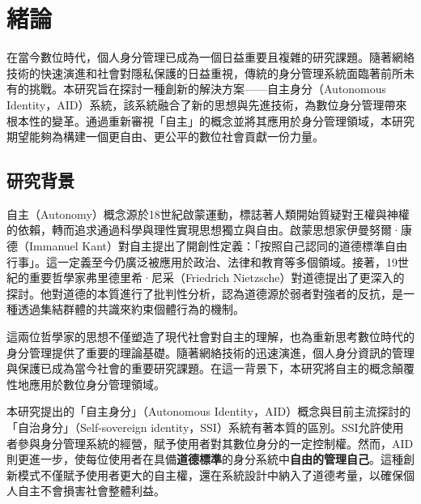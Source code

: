 
\chapter{緒論}
在當今數位時代，個人身分管理已成為一個日益重要且複雜的研究課題。隨著網絡技術的快速演進和社會對隱私保護的日益重視，傳統的身分管理系統面臨著前所未有的挑戰。本研究旨在探討一種創新的解決方案——自主身分（Autonomous Identity，AID）系統，該系統融合了新的思想與先進技術，為數位身分管理帶來根本性的變革。通過重新審視「自主」的概念並將其應用於身分管理領域，本研究期望能夠為構建一個更自由、更公平的數位社會貢獻一份力量。
\section{研究背景}
自主（Autonomy）概念源於18世紀啟蒙運動，標誌著人類開始質疑對王權與神權的依賴，轉而追求通過科學與理性實現思想獨立與自由。啟蒙思想家伊曼努爾·康德（Immanuel Kant）對自主提出了開創性定義：「按照自己認同的道德標準自由行事」。這一定義至今仍廣泛被應用於政治、法律和教育等多個領域。接著，19世紀的重要哲學家弗里德里希·尼采（Friedrich Nietzsche）對道德提出了更深入的探討。他對道德的本質進行了批判性分析，認為道德源於弱者對強者的反抗，是一種透過集結群體的共識來約束個體行為的機制。

這兩位哲學家的思想不僅塑造了現代社會對自主的理解，也為重新思考數位時代的身分管理提供了重要的理論基礎。隨著網絡技術的迅速演進，個人身分資訊的管理與保護已成為當今社會的重要研究課題。在這一背景下，本研究將自主的概念顛覆性地應用於數位身分管理領域。

本研究提出的「自主身分」（Autonomous Identity，AID）概念與目前主流探討的「自治身分」（Self-sovereign identity，SSI）系統有著本質的區別。SSI允許使用者參與身分管理系統的經營，賦予使用者對其數位身分的一定控制權。然而，AID則更進一步，使每位使用者在具備\textbf{道德標準}的身分系統中\textbf{自由的管理自己}。這種創新模式不僅賦予使用者更大的自主權，還在系統設計中納入了道德考量，以確保個人自主不會損害社會整體利益。
